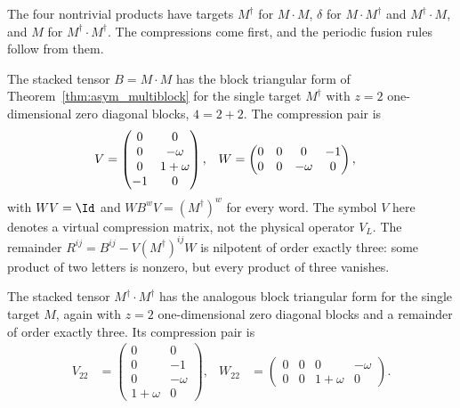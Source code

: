 The four nontrivial products have targets $M^\dagger$ for $M\cdot M$,
$\delta$ for $M\cdot M^\dagger$ and $M^\dagger\cdot M$, and $M$ for
$M^\dagger\cdot M^\dagger$. The compressions come first, and the periodic
fusion rules follow from them.

\begin{lemma}
    \label{thm:asymex_z3anomalous_uu_compression}
    \leanok
    The stacked tensor $B=M\cdot M$ has the block triangular form of
    Theorem~\ref{thm:asym_multiblock} for the single target $M^\dagger$ with $z=2$
    one-dimensional zero diagonal blocks, $4=2+2$. The compression pair is
    \begin{align}
        V & =\begin{pmatrix}0&0\\0&-\omega\\0&1+\omega\\-1&0\end{pmatrix}, &
        W & =\begin{pmatrix}0&0&0&-1\\0&0&-\omega&0\end{pmatrix},
        \notag
    \end{align}
    with $WV=\Id$ and $WB^wV=(M^\dagger)^w$ for every word.
    The symbol $V$ here denotes a virtual compression matrix, not the
    physical operator $V_L$.
    The remainder $R^{ij}=B^{ij}-V(M^\dagger)^{ij}W$ is nilpotent of
    order exactly three: some product of two letters is nonzero, but
    every product of three vanishes.

    The stacked tensor $M^\dagger\cdot M^\dagger$ has the analogous block
    triangular form for the single target $M$, again with $z=2$
    one-dimensional zero diagonal blocks and a remainder of order exactly three.
    Its compression pair is
    \begin{align}
        V_{22} & =\begin{pmatrix}0&0\\0&-1\\0&-\omega\\1+\omega&0\end{pmatrix}, &
        W_{22} & =\begin{pmatrix}0&0&0&-\omega\\0&0&1+\omega&0\end{pmatrix}.
    \end{align}
\end{lemma}

